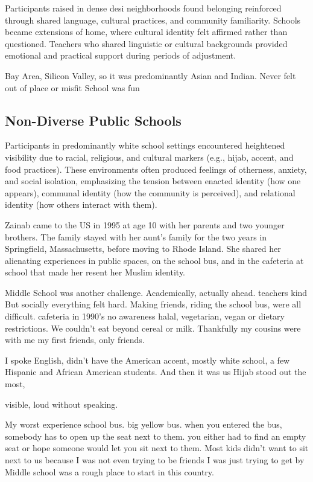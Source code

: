 Participants raised in dense desi neighborhoods found belonging reinforced through shared language, cultural practices, and community familiarity. Schools became extensions of home, where cultural identity felt affirmed rather than questioned. Teachers who shared linguistic or cultural backgrounds provided emotional and practical support during periods of adjustment.

\begin{FoundPoem}
Bay Area, Silicon Valley, so it was predominantly Asian and Indian. 
Never felt out of place or misfit
School was fun
\end{FoundPoem}

\subsection{Non-Diverse Public Schools}

Participants in predominantly white school settings encountered heightened visibility due to racial, religious, and cultural markers (e.g., hijab, accent, and food practices). These environments often produced feelings of otherness, anxiety, and social isolation, emphasizing the tension between enacted identity (how one appears), communal identity (how the community is perceived), and relational identity (how others interact with them). 

Zainab came to the US in 1995 at age 10 with her parents and two younger brothers. The family stayed with her aunt’s family for the two years in Springfield, Massachusetts, before moving to Rhode Island. She shared her alienating experiences in public spaces, on the school bus, and in the cafeteria at school that made her resent her Muslim identity.

\begin{FoundPoem}
Middle School was another challenge. 
Academically, actually ahead. 
 teachers kind 
 But socially  everything felt  hard. 
 Making friends, 
 riding the school bus, 
 were all difficult. 
                       cafeteria   
in 1990’s	no awareness          halal, vegetarian, vegan 
              or dietary restrictions. 
We couldn’t eat      beyond cereal or milk. 
Thankfully my cousins were with me
my first friends,                           only friends.

I spoke English, 	 didn’t have the American accent, 
mostly white school, 
a few Hispanic and African American students. 
And then it was us 
Hijab                          stood out the most, 

visible,
loud             without speaking. 

My worst experience    
school bus.  
         big yellow bus.  
when you entered the bus,    
somebody has to open up the seat next to them.  
you either had to find an empty seat or  
hope someone would let you sit next to them. 
Most kids didn’t want to sit next to us  
because 
I was not even trying to be friends 
I was just trying to get by  
Middle school was a rough place 
to start in this country.
\end{FoundPoem}

